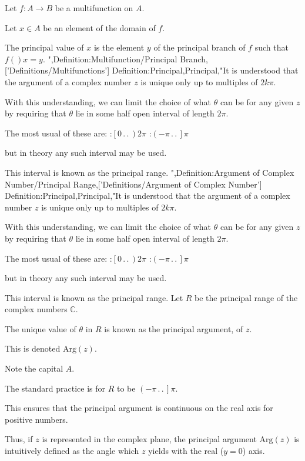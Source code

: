 Let $f: A \to B$ be a multifunction on $A$.

Let $x \in A$ be an element of the domain of $f$.

The principal value of $x$ is the element $y$ of the principal branch of $f$ such that $f \left(   \right)x = y$.
",Definition:Multifunction/Principal Branch,['Definitions/Multifunctions']
Definition:Principal,Principal,"It is understood that the argument of a complex number $z$ is unique only up to multiples of $2 k \pi$.

With this understanding, we can limit the choice of what $\theta$ can be for any given $z$ by requiring that $\theta$ lie in some half open interval of length $2 \pi$.

The most usual of these are:
:$\left[ 0 \,.\,.\,   \right){2 \pi}$
:$\left( -\pi \,.\,.\,   \right]\pi$

but in theory any such interval may be used.

This interval is known as the principal range.
",Definition:Argument of Complex Number/Principal Range,['Definitions/Argument of Complex Number']
Definition:Principal,Principal,"It is understood that the argument of a complex number $z$ is unique only up to multiples of $2 k \pi$.

With this understanding, we can limit the choice of what $\theta$ can be for any given $z$ by requiring that $\theta$ lie in some half open interval of length $2 \pi$.

The most usual of these are:
:$\left[ 0 \,.\,.\,   \right){2 \pi}$
:$\left( -\pi \,.\,.\,   \right]\pi$

but in theory any such interval may be used.

This interval is known as the principal range.
Let $R$ be the principal range of the complex numbers $\mathbb C$.

The unique value of $\theta$ in $R$ is known as the principal argument, of $z$.

This is denoted $\mathrm {Arg} \left( z \right)$.

Note the capital $A$.

The standard practice is for $R$ to be $\left( -\pi \,.\,.\,   \right]\pi$.

This ensures that the principal argument is continuous on the real axis for positive numbers.

Thus, if $z$ is represented in the complex plane, the principal argument $\mathrm {Arg} \left( z \right)$ is intuitively defined as the angle which $z$ yields with the real ($y = 0$) axis.



